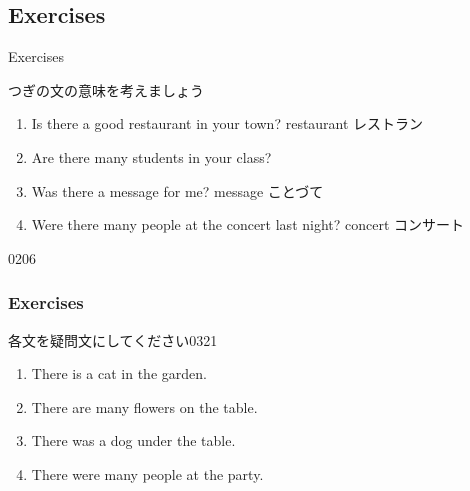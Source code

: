 \documentclass[aspectratio=169,xcolor={dvipsnames,table}]{beamer}
\newcommand{\myaudio}[1]{\href{#1}{\faVolumeUp}}
\begin{document}
 \subsection{Exercises}
\begin{frame}[plain]{Exercises}

つぎの文の意味を考えましょう
\begin{enumerate}
 \item Is there a good restaurant in your town?%
\hfill{\scriptsize restaurant  レストラン}
 \item Are there many students in your class?
 \item Was there a message for me?%
\hfill{\scriptsize message  ことづて}
 \item Were there many people at the concert last night?%
\hfill{\scriptsize concert  コンサート}
\end{enumerate}

\hfill{\tiny 0206}\,{\scriptsize \myaudio{./audio/001_there_is_07.mp3}}
\end{frame}
\begin{frame}[plain]\frametitle{Exercises}
各文を疑問文にしてください\hfill{\tiny 0321}\,{\scriptsize \myaudio{./audio/001_there_is_08.mp3}}

  \begin{enumerate}
   \item There is a cat in the garden.\\
   \item There are many flowers on the table.\\
   \item There was a dog under the table.\\
   \item There were many people at the party.\\
  \end{enumerate}
\end{frame}
\end{document}
